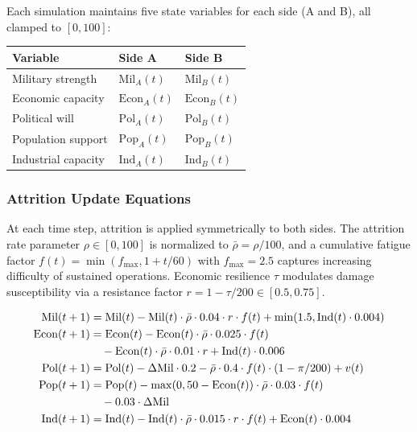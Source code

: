 Each simulation maintains five state variables for each side (A and B), all clamped to $[0, 100]$:

\begin{tabular}{@{}lll@{}}
\textbf{Variable} & \textbf{Side A} & \textbf{Side B} \\
\midrule
Military strength & $\text{Mil}_A(t)$ & $\text{Mil}_B(t)$ \\
Economic capacity & $\text{Econ}_A(t)$ & $\text{Econ}_B(t)$ \\
Political will & $\text{Pol}_A(t)$ & $\text{Pol}_B(t)$ \\
Population support & $\text{Pop}_A(t)$ & $\text{Pop}_B(t)$ \\
Industrial capacity & $\text{Ind}_A(t)$ & $\text{Ind}_B(t)$ \\
\end{tabular}

\subsubsection{Attrition Update Equations}

At each time step, attrition is applied symmetrically to both sides. The attrition rate parameter $\rho \in [0, 100]$ is normalized to $\bar{\rho} = \rho / 100$, and a cumulative fatigue factor $f(t)=\min(f_{\max}, 1+t/60)$ with $f_{\max}=2.5$ captures increasing difficulty of sustained operations. Economic resilience $\tau$ modulates damage susceptibility via a resistance factor $r = 1 - \tau/200 \in [0.5, 0.75]$.

\begin{align}
\text{Mil}(t+1) &= \text{Mil}(t) - \text{Mil}(t) \cdot \bar{\rho} \cdot 0.04 \cdot r \cdot f(t) + \min(1.5, \text{Ind}(t) \cdot 0.004) \label{eq:sim_mil} \\
\text{Econ}(t+1) &= \text{Econ}(t) - \text{Econ}(t) \cdot \bar{\rho} \cdot 0.025 \cdot f(t) \notag \\
&\quad - \text{Econ}(t) \cdot \bar{\rho} \cdot 0.01 \cdot r + \text{Ind}(t) \cdot 0.006 \label{eq:sim_econ} \\
\text{Pol}(t+1) &= \text{Pol}(t) - \Delta\text{Mil} \cdot 0.2 - \bar{\rho} \cdot 0.4 \cdot f(t) \cdot (1 - \pi/200) + v(t) \label{eq:sim_pol} \\
\text{Pop}(t+1) &= \text{Pop}(t) - \max(0, 50 - \text{Econ}(t)) \cdot \bar{\rho} \cdot 0.03 \cdot f(t) \notag \\
&\quad - 0.03 \cdot \Delta\text{Mil} \label{eq:sim_pop} \\
\text{Ind}(t+1) &= \text{Ind}(t) - \text{Ind}(t) \cdot \bar{\rho} \cdot 0.015 \cdot r \cdot f(t) + \text{Econ}(t) \cdot 0.004 \label{eq:sim_ind}
\end{align}

